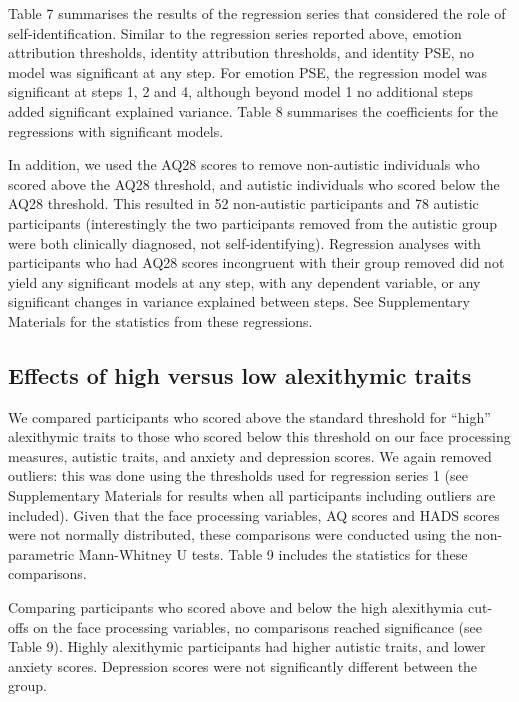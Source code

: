 \documentclass[
]{article}
\begin{document}
Table 7 summarises the results of the regression series that considered the role of self-identification. Similar to the regression series reported above, emotion attribution thresholds, identity attribution thresholds, and identity PSE, no model was significant at any step. For emotion PSE, the regression model was significant at steps 1, 2 and 4, although beyond model 1 no additional steps added significant explained variance. Table 8 summarises the coefficients for the regressions with significant models.

In addition, we used the AQ28 scores to remove non-autistic individuals who scored above the AQ28 threshold, and autistic individuals who scored below the AQ28 threshold. This resulted in 52 non-autistic participants and 78 autistic participants (interestingly the two participants removed from the autistic group were both clinically diagnosed, not self-identifying). Regression analyses with participants who had AQ28 scores incongruent with their group removed did not yield any significant models at any step, with any dependent variable, or any significant changes in variance explained between steps. See Supplementary Materials for the statistics from these regressions.

\hypertarget{effects-of-high-versus-low-alexithymic-traits}{%
\subsection*{Effects of high versus low alexithymic traits}\label{effects-of-high-versus-low-alexithymic-traits}}

We compared participants who scored above the standard threshold for ``high'' alexithymic traits to those who scored below this threshold on our face processing measures, autistic traits, and anxiety and depression scores. We again removed outliers: this was done using the thresholds used for regression series 1 (see Supplementary Materials for results when all participants including outliers are included). Given that the face processing variables, AQ scores and HADS scores were not normally distributed, these comparisons were conducted using the non-parametric Mann-Whitney U tests. Table 9 includes the statistics for these comparisons.

Comparing participants who scored above and below the high alexithymia cut-offs on the face processing variables, no comparisons reached significance (see Table 9). Highly alexithymic participants had higher autistic traits, and lower anxiety scores. Depression scores were not significantly different between the group.
\end{document}
